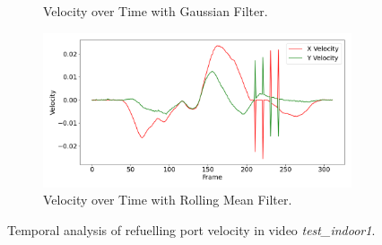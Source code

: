 \documentclass[12pt,oneside]{book} %
\begin{document}
\begin{figure}[H]
\begin{subfigure}[t]{0.65\textwidth}
        \caption{Velocity over Time with Gaussian Filter.}
        \label{fig:velocity-test-indoor1-gaussian}
    \end{subfigure}
    \hfill
    \begin{subfigure}[t]{0.65\textwidth}
        \includegraphics[width=\textwidth]{figures/bbox_metrics/test_indoor1 (Rolling Mean Filter)_velocity.png}
        \caption{Velocity over Time with Rolling Mean Filter.}
        \label{fig:velocity-test-indoor1-rolling}
    \end{subfigure}
    \caption{Temporal analysis of refuelling port velocity in video \textit{test\_indoor1}.}
    \label{fig:velocity-test-indoor1}
\end{figure}
\end{document}
